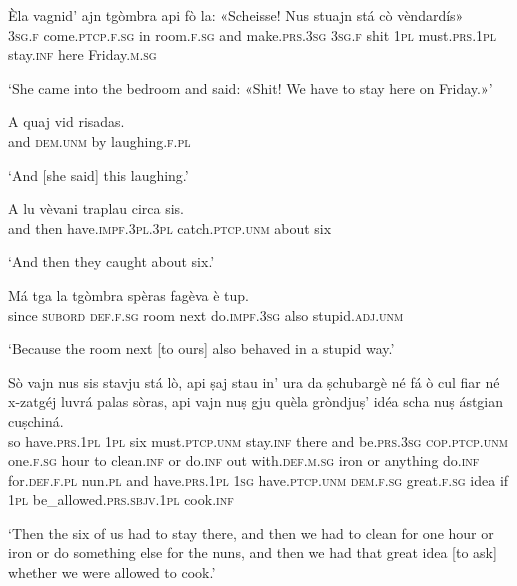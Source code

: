 \begin{linenumbers}
\gll Èla vagnid’ ajn tgòmbra api fò la: «Scheisse\footnotemark! Nus stuajn stá cò vèndardís»\\
\textsc{3sg.f} come.\textsc{ptcp.f.sg} in room.\textsc{f.sg} and make.\textsc{prs.3sg} \textsc{3sg.f} shit \textsc{1pl} must.\textsc{prs.1pl} stay.\textsc{inf} here Friday.\textsc{m.sg}\\
\end{linenumbers}
\medskip
\glt `She came into the bedroom and said: «Shit!
We have to stay here on Friday.»'
\medskip

\begin{linenumbers}
\gll    A quaj vid risadas.\\
and \textsc{dem.unm} by laughing.\textsc{f.pl}\\
\end{linenumbers}
\medskip
\glt `And [she said] this laughing.'
\medskip

\begin{linenumbers}
\gll    A lu vèvani traplau circa sis.\\
and then have.\textsc{impf.3pl.3pl} catch.\textsc{ptcp.unm} about six \\
\end{linenumbers}
\medskip
\glt `And then they caught about six.'
\medskip

\begin{linenumbers}
\gll    Má tga la tgòmbra spèras fagèva è tup.\\
since \textsc{subord} \textsc{def.f.sg} room next do.\textsc{impf.3sg} also stupid.\textsc{adj.unm}\\
\end{linenumbers}
\medskip
\glt `Because the room next [to ours] also behaved in a stupid way.'
\medskip

\begin{linenumbers}
\gll Sò\footnotemark{} vajn nus sis stavju stá lò, api ṣaj stau in’ ura da ṣchubargè né fá ò cul fiar né x-zatgéj luvrá palas sòras, api vajn nuṣ gju quèla gròndjuṣ’ idéa scha nuṣ ástgian cuṣchiná.\\
so have.\textsc{prs.1pl} \textsc{1pl} six must.\textsc{ptcp.unm} stay.\textsc{inf} there and be.\textsc{prs.3sg} \textsc{cop.ptcp.unm} one.\textsc{f.sg} hour to clean.\textsc{inf} or do.\textsc{inf} out with.\textsc{def.m.sg} iron or anything do.\textsc{inf} for.\textsc{def.f.pl} nun.\textsc{pl} and have.\textsc{prs.1pl} \textsc{1sg} have.\textsc{ptcp.unm} \textsc{dem.f.sg} great.\textsc{f.sg} idea if \textsc{1pl} be\_allowed.\textsc{prs.sbjv.1pl} cook.\textsc{inf}\\
\end{linenumbers}
\medskip
\glt `Then the six of us had to stay there, and then we had to clean for one hour or iron or do something else for the nuns, and then we had that great idea [to ask] whether we were allowed to cook.'
\medskip

